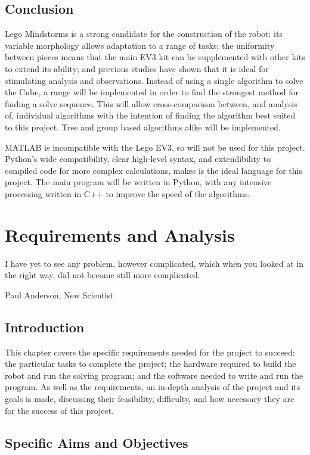 \documentclass{report}
\begin{document}
    \section{Conclusion}
    Lego Mindstorms is a strong candidate for the construction of the robot: its variable morphology allows adaptation to a range of tasks; the uniformity between pieces means that the main EV3 kit can be supplemented with other kits to extend its ability; and previous studies have shown that it is ideal for stimulating analysis and observations. Instead of using a single algorithm to solve the Cube, a range will be implemented in order to find the strongest method for finding a solve sequence. This will allow cross-comparison between, and analysis of, individual algorithms with the intention of finding the algorithm best suited to this project. Tree and group based algorithms alike will be implemented.
    
    MATLAB is incompatible with the Lego EV3, so will not be used for this project. Python's wide compatibility, clear high-level syntax, and extendibility to compiled code for more complex calculations, makes is the ideal language for this project. The main program will be written in Python, with any intensive processing written in C++ to improve the speed of the algorithms.
   
    \newpage
    \chapter{Requirements and Analysis}
    \epigraph{I have yet to see any problem, however complicated, which when you looked at in the right way, did not become still more complicated.}{Paul Anderson, New Scientist \cite{Anderson1969}}
    
    \section{Introduction} %
    This chapter covers the specific requirements needed for the project to succeed: the particular tasks to complete the project; the hardware required to build the robot and run the solving program; and the software needed to write and run the program. As well as the requirements, an in-depth analysis of the project and its goals is made, discussing their feasibility, difficulty, and how necessary they are for the success of this project.
    
    \section{Specific Aims and Objectives}
    
\end{document}
